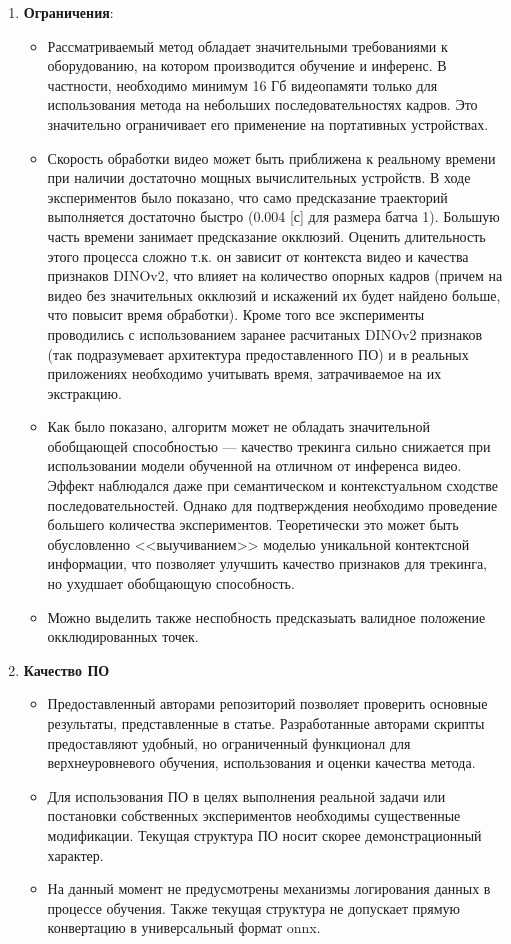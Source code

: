 \documentclass[a4paper, 14pt]{extarticle}
\theoremstyle{definition}
\theoremstyle{plain}
\theoremstyle{remark}
\begin{document}
\begin{enumerate}
    \item \textbf{Ограничения}:
    \begin{itemize}
        \item Рассматриваемый метод обладает значительными требованиями к оборудованию, на котором производится обучение и инференс. В частности, необходимо минимум 16 Гб видеопамяти только для использования метода на небольших последовательностях кадров. Это значительно ограничивает его применение на портативных устройствах.
        \item Скорость обработки видео может быть приближена к реальному времени при наличии достаточно мощных вычислительных устройств. В ходе экспериментов было показано, что само предсказание траекторий выполняется достаточно быстро (0.004 [с] для размера батча 1). Большую часть времени занимает предсказание окклюзий. Оценить длительность этого процесса сложно т.к. он зависит от контекста видео и качества признаков DINOv2, что влияет на количество опорных кадров (причем на видео без значительных окклюзий и искажений их будет найдено больше, что повысит время обработки). Кроме того все эксперименты проводились с использованием заранее расчитаных DINOv2 признаков (так подразумевает архитектура предоставленного ПО) и в реальных приложениях необходимо учитывать время, затрачиваемое на их экстракцию.
        \item Как было показано, алгоритм может не обладать значительной обобщающей способностью --- качество трекинга сильно снижается при использовании модели обученной на отличном от инференса видео. Эффект наблюдался даже при семантическом и контекстуальном сходстве последовательностей. Однако для подтверждения необходимо проведение большего количества экспериментов. Теоретически это может быть обусловленно <<выучиванием>> моделью уникальной контектсной информации, что позволяет улучшить качество признаков для трекинга, но ухудшает обобщающую способность.
        \item Можно выделить также неспобность предсказыать валидное положение окклюдированных точек.
    \end{itemize}

    \item \textbf{Качество ПО}
    \begin{itemize}
        \item Предоставленный авторами репозиторий позволяет проверить основные результаты, представленные в статье. Разработанные авторами скрипты предоставляют удобный, но ограниченный функционал для верхнеуровневого обучения, использования и оценки качества метода.
        \item Для использования ПО в целях выполнения реальной задачи или постановки собственных экспериментов необходимы существенные модификации. Текущая структура ПО носит скорее демонстрационный характер.
        \item На данный момент не предусмотрены механизмы логирования данных в процессе обучения. Также текущая структура не допускает прямую конвертацию в универсальный формат onnx.
    \end{itemize}


\end{enumerate}
\end{document}
